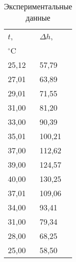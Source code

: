 \documentclass[a4paper, 12pt]{article}
\begin{document}
\begin{table}[h!] 
	\caption{Экспериментальные данные}
	\begin{center}
	\begin{tabular}{|*{2}{l|}}
		\hline 
		$t$,&$\Delta h$,      \\ 
		$^{\circ}$C&\text{мм} \\ \hline

		25,12 & 57,79   	  \\ \hline 
		27,01 & 63,89   	  \\ \hline 
		29,01 & 71,55   	  \\ \hline 
		31,00 & 81,20   	  \\ \hline 
		33,00 & 90,39   	  \\ \hline 
		35,01 & 100,21  	  \\ \hline 
		37,00 & 112,62  	  \\ \hline 
		39,00 & 124,57  	  \\ \hline 
		40,00 & 130,25  	  \\ \hline \hline
		37,01 & 109,06  	  \\ \hline 
		34,00 & 93,41   	  \\ \hline 
		31,00 & 79,34   	  \\ \hline 
		28,00 & 68,25   	  \\ \hline 
		25,00 & 58,50   	  \\ \hline 

	\end{tabular}
	\end{center}
\end{table}
\end{document}
